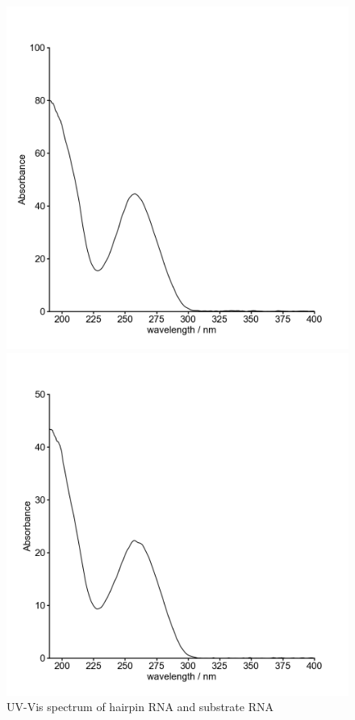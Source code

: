 \documentclass{ltjsarticle}
\theoremstyle{definition}
\numberwithin{equation}{section}
\begin{document}
\begin{figure}[htbp]
 \begin{minipage}[b]{0.5\linewidth}
  \centering
  \includegraphics[keepaspectratio, scale=0.3]
  {B_Hairpin_UV-vis.png}
 \end{minipage}
 \begin{minipage}[b]{0.5\linewidth}
  \centering
  \includegraphics[keepaspectratio, scale=0.3]
  {B_Substrate_UV-vis.png}
 \end{minipage}
 \caption{UV-Vis spectrum of hairpin RNA and substrate RNA}
 \label{fig_nanodrop}
\end{figure}
\end{document}
